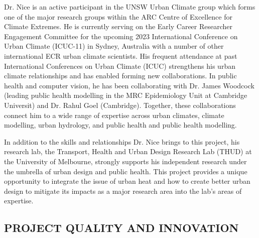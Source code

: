 Dr. Nice is an active participant in the UNSW Urban Climate group which forms one of the major research groups within the ARC Centre of Excellence for Climate Extremes. He is currently serving on the Early Career Researcher Engagement Committee for the upcoming 2023 International Conference on Urban Climate (ICUC-11) in Sydney, Australia with a number of other international ECR urban climate scientists. His frequent attendance at past International Conferences on Urban Climate (ICUC) strengthens his urban climate relationships and has enabled forming new collaborations. In public health and computer vision, he has been collaborating with Dr. James Woodcock (leading public health modelling in the MRC Epidemiology Unit at Cambridge Universit) and Dr. Rahul Goel (Cambridge). Together, these collaborations connect him to a wide range of expertise across urban climates, climate modelling, urban hydrology, and public health and public health modelling.

In addition to the skills and relationships Dr. Nice brings to this project, his research lab, the Transport, Health and Urban Design Research Lab (THUD) at the University of Melbourne, strongly supports his independent research under the umbrella of urban design and public health. This project provides a unique opportunity to integrate the issue of urban heat and how to create better urban design to mitigate its impacts as a major research area into the lab's areas of expertise.

\subsection*{\TitleFont PROJECT QUALITY AND INNOVATION}




